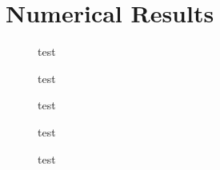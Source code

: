 \section{Numerical Results}

\begin{figure}[h]
  \centering
  
  \caption{test}\label{fig:linf-error}
\end{figure}

\begin{figure}[h]
  \centering
  
  \caption{test}\label{fig:timings}
\end{figure}


\begin{figure}[h]
  \centering
  
  \caption{test}\label{fig:raddiff}
\end{figure}

\begin{figure}[h]
  \centering
  
  \caption{test}\label{fig:errorbound}
\end{figure}

\begin{figure}[h]
  \centering
  
  \caption{test}\label{fig:testfunc}
\end{figure}

